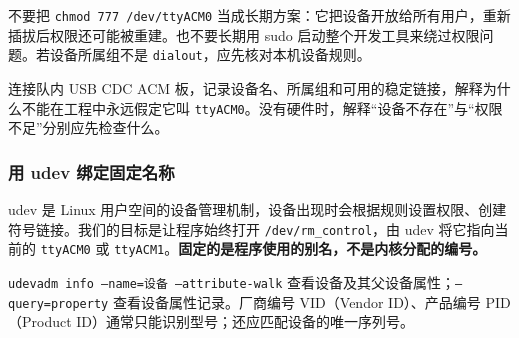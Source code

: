 \begin{note}
不要把 \texttt{chmod 777 /dev/ttyACM0} 当成长期方案：它把设备开放给所有用户，重新插拔后权限还可能被重建。也不要长期用 sudo 启动整个开发工具来绕过权限问题。若设备所属组不是 \texttt{dialout}，应先核对本机设备规则。
\end{note}

\begin{exercise}\label{ex:serial-device}
连接队内 USB CDC ACM 板，记录设备名、所属组和可用的稳定链接，解释为什么不能在工程中永远假定它叫 \texttt{ttyACM0}。没有硬件时，解释“设备不存在”与“权限不足”分别应先检查什么。
\end{exercise}

\subsubsection{用 udev 绑定固定名称}
\label{sec:serial-udev}

udev 是 Linux 用户空间的设备管理机制，设备出现时会根据规则设置权限、创建符号链接。我们的目标是让程序始终打开 \texttt{/dev/rm\_control}，由 udev 将它指向当前的 \texttt{ttyACM0} 或 \texttt{ttyACM1}。\textbf{固定的是程序使用的别名，不是内核分配的编号。}

\texttt{udevadm info --name=设备 --attribute-walk} 查看设备及其父设备属性；\texttt{--query=property} 查看设备属性记录。厂商编号 VID（Vendor ID）、产品编号 PID（Product ID）通常只能识别型号；还应匹配设备的唯一序列号。

